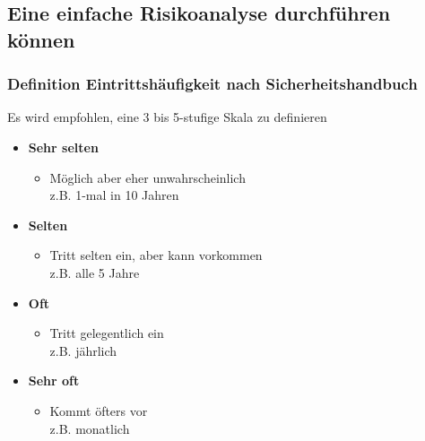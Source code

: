 \documentclass[10pt,a4paper]{article}
\begin{document}
\subsection*{Eine einfache Risikoanalyse durchführen können}

\subsubsection*{Definition Eintrittshäufigkeit nach Sicherheitshandbuch}
Es wird empfohlen, eine 3 bis 5-stufige Skala zu definieren

\begin{itemize}[noitemsep,topsep=0pt,leftmargin=*]
    \item \textbf{Sehr selten}
    \begin{itemize}[noitemsep,topsep=0pt,leftmargin=*]
        \item Möglich aber eher unwahrscheinlich \\z.B. 1-mal in 10 Jahren
    \end{itemize}
    \item \textbf{Selten}
    \begin{itemize}[noitemsep,topsep=0pt,leftmargin=*]
        \item Tritt selten ein, aber kann vorkommen\\z.B. alle 5 Jahre
    \end{itemize}
    \item \textbf{Oft}
    \begin{itemize}[noitemsep,topsep=0pt,leftmargin=*]
        \item Tritt gelegentlich ein\\z.B. jährlich
    \end{itemize}
    \item \textbf{Sehr oft}
    \begin{itemize}[noitemsep,topsep=0pt,leftmargin=*]
        \item Kommt öfters vor\\z.B. monatlich
    \end{itemize}
\end{itemize}
\end{document}
